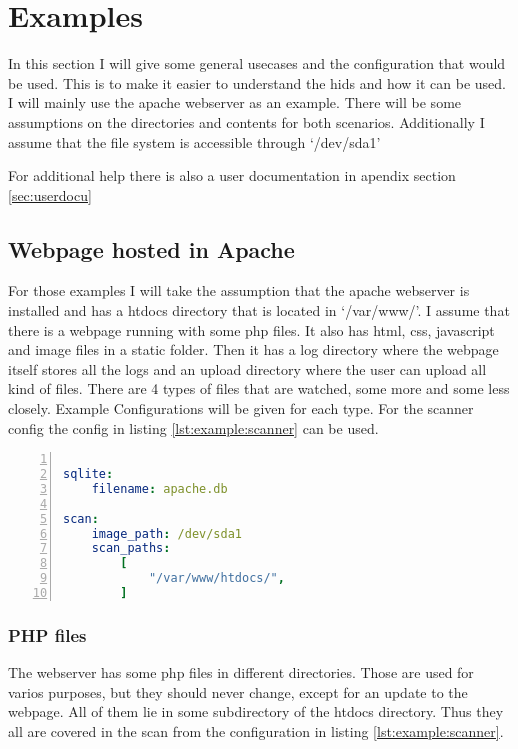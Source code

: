 \section{Examples}
\label{sec:Exaples}

In this section I will give some general usecases and the configuration that would be used. This is to make it easier to understand the \gls{hids} and how it can be used. I will mainly use the apache webserver as an example. There will be some assumptions on the directories and contents for both scenarios. Additionally I assume that the file system is accessible through `/dev/sda1' 

For additional help there is also a user documentation in apendix section \ref{sec:userdocu}

\subsection{Webpage hosted in Apache}

For those examples I will take the assumption that the apache webserver is installed and has a htdocs directory that is located in `/var/www/'. I assume that there is a webpage running with some php files. It also has html, css, javascript and image files in a static folder. Then it has a log directory where the webpage itself stores all the logs and an upload directory where the user can upload all kind of files. There are 4 types of files that are watched, some more and some less closely. Example Configurations will be given for each type. For the scanner config the config in listing \ref{lst:example:scanner} can be used.

\begin{lstlisting}[language=yaml, numbers=left, caption=Scanner Configuration, label=lst:example:scanner]

sqlite:
    filename: apache.db

scan:
    image_path: /dev/sda1
    scan_paths: 
        [
            "/var/www/htdocs/",
        ]

\end{lstlisting}

\subsubsection{PHP files}

The webserver has some php files in different directories. Those are used for varios purposes, but they should never change, except for an update to the webpage. All of them lie in some subdirectory of the htdocs directory. Thus they all are covered in the scan from the configuration in listing \ref{lst:example:scanner}. 

